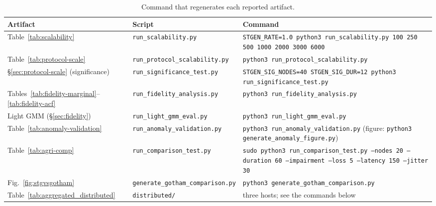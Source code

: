 \documentclass[jsan,article,submit,moreauthors,pdftex]{Definitions/mdpi}
\begin{document}
\begin{table}[t] %
\centering
\caption{Command that regenerates each reported artifact.}
\label{tab:repro-commands}
\small
\begin{tabularx}{\textwidth}{@{}ll>{\raggedright\arraybackslash}X@{}}
\toprule
\textbf{Artifact} & \textbf{Script} & \textbf{Command} \\ \midrule
Table~\ref{tab:scalability} & \texttt{run\_scalability.py} & \texttt{STGEN\_RATE=1.0 python3 run\_scalability.py 100 250 500 1000 2000 3000 6000} \\ \addlinespace
Table~\ref{tab:protocol-scale} & \texttt{run\_protocol\_scalability.py} & \texttt{python3 run\_protocol\_scalability.py} \\ \addlinespace
\S\ref{sec:protocol-scale} (significance) & \texttt{run\_significance\_test.py} & \texttt{STGEN\_SIG\_NODES=40 STGEN\_SIG\_DUR=12 python3 run\_significance\_test.py} \\ \addlinespace
Tables~\ref{tab:fidelity-marginal}--\ref{tab:fidelity-acf} & \texttt{run\_fidelity\_analysis.py} & \texttt{python3 run\_fidelity\_analysis.py} \\ \addlinespace
Light GMM (\S\ref{sec:fidelity}) & \texttt{run\_light\_gmm\_eval.py} & \texttt{python3 run\_light\_gmm\_eval.py} \\ \addlinespace
Table~\ref{tab:anomaly-validation} & \texttt{run\_anomaly\_validation.py} & \texttt{python3 run\_anomaly\_validation.py} (figure: \texttt{python3 generate\_anomaly\_figure.py}) \\ \addlinespace
Table~\ref{tab:agri-comp} & \texttt{run\_comparison\_test.py} & \texttt{sudo python3 run\_comparison\_test.py --nodes 20 --duration 60 --impairment --loss 5 --latency 150 --jitter 30} \\ \addlinespace
Fig.~\ref{fig:stgvsgotham} & \texttt{generate\_gotham\_comparison.py} & \texttt{python3 generate\_gotham\_comparison.py} \\ \addlinespace
Table~\ref{tab:aggregated_distributed} & \texttt{distributed/} & three hosts; see the commands below \\
\bottomrule
\end{tabularx}
\end{table}
\end{document}
